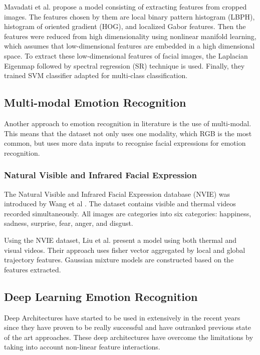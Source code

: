 

Mavadati et al. propose a model consisting of extracting features from cropped images. The features chosen by them are local binary pattern histogram (LBPH), histogram of oriented gradient (HOG), and localized Gabor features. Then the features were reduced from high dimensionality using nonlinear manifold learning, which assumes that low-dimensional features are embedded in a high dimensional space. To extract these low-dimensional features of facial images, the Laplacian Eigenmap followed by spectral regression (SR) technique is used. Finally, they trained SVM classifier adapted for multi-class classification. 

\subsection{Multi-modal Emotion Recognition}
Another approach to emotion recognition in literature is the use of multi-modal. This means that the dataset not only uses one modality, which RGB is the most common, but uses more data inputs to recognise facial expressions for emotion recognition. 

\subsubsection{Natural Visible and Infrared Facial Expression}
The Natural Visible and Infrared Facial Expression database (NVIE) was introduced by Wang et al \cite{Wang2010AInference}. The dataset contains visible and thermal videos recorded simultaneously. All images are categories into six categories: happiness, sadness, surprise, fear, anger, and disgust. 



Using the NVIE dataset, Liu et al. \cite{LiuSPONTANEOUSDESCRIPTOR} present a model using both thermal and visual videos. Their approach uses fisher vector aggregated by local and global trajectory features. Gaussian mixture models are constructed based on the features extracted. 



\subsection{Deep Learning Emotion Recognition}
Deep Architectures have started to be used in extensively in the recent years since they have proven to be really successful and have outranked previous state of the art approaches. These deep architectures have overcome the limitations by taking into account non-linear feature interactions.

